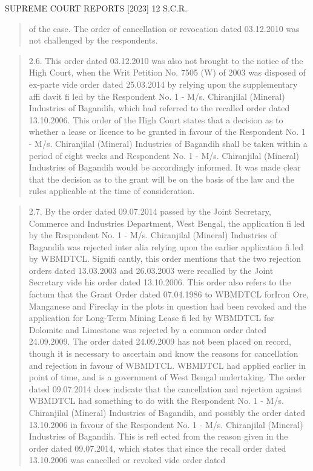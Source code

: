 \documentclass[12pt,a4paper]{article}
\newenvironment{judgequote}
  {\begin{quote}\small}
  {\end{quote}}
\begin{document}
 SUPREME COURT REPORTS [2023] 12 S.C.R.


\begin{judgequote}
of the case. The order of cancellation or revocation dated 03.12.2010 was
not challenged by the respondents.
\end{judgequote}

\begin{judgequote}
2.6. This order dated 03.12.2010 was also not brought to the notice
of the High Court, when the Writ Petition No. 7505 (W) of 2003 was
disposed of ex-parte vide order dated 25.03.2014 by relying upon the
supplementary affi davit fi led by the Respondent No. 1 - M/s. Chiranjilal
(Mineral) Industries of Bagandih, which had referred to the recalled order
dated 13.10.2006. This order of the High Court states that a decision as to
whether a lease or licence to be granted in favour of the Respondent No.
1 - M/s. Chiranjilal (Mineral) Industries of Bagandih shall be taken within
a period of eight weeks and Respondent No. 1 - M/s. Chiranjilal (Mineral)
Industries of Bagandih would be accordingly informed. It was made clear
that the decision as to the grant will be on the basis of the law and the rules
applicable at the time of consideration.
\end{judgequote}

\begin{judgequote}
2.7. By the order dated 09.07.2014 passed by the Joint Secretary,
Commerce and Industries Department, West Bengal, the application
fi led by the Respondent No. 1 - M/s. Chiranjilal (Mineral) Industries of
Bagandih was rejected inter alia relying upon the earlier application fi led
by WBMDTCL. Signifi cantly, this order mentions that the two rejection
orders dated 13.03.2003 and 26.03.2003 were recalled by the Joint Secretary
vide his order dated 13.10.2006. This order also refers to the factum that the
Grant Order dated 07.04.1986 to WBMDTCL forIron Ore, Manganese and
Fireclay in the plots in question had been revoked and the application for
Long-Term Mining Lease fi led by WBMDTCL for Dolomite and Limestone
was rejected by a common order dated 24.09.2009. The order dated
24.09.2009 has not been placed on record, though it is necessary to ascertain
and know the reasons for cancellation and rejection in favour of WBMDTCL.
WBMDTCL had applied earlier in point of time, and is a government of
West Bengal undertaking. The order dated 09.07.2014 does indicate that the
cancellation and rejection against WBMDTCL had something to do with
the Respondent No. 1 - M/s. Chiranjilal (Mineral) Industries of Bagandih,
and possibly the order dated 13.10.2006 in favour of the Respondent No.
1 - M/s. Chiranjilal (Mineral) Industries of Bagandih. This is refl ected from
the reason given in the order dated 09.07.2014, which states that since the
recall order dated 13.10.2006 was cancelled or revoked vide order dated
\end{judgequote}
\end{document}
